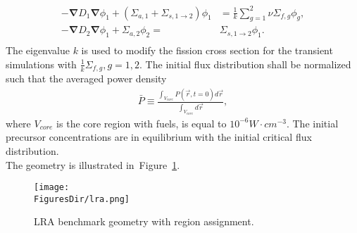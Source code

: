 \documentclass[12pt]{scrartcl}
\newcommand{\grad}{\bs{\nabla}}
\newcommand{\fig}[1]{Figure~\ref{#1}}                      %
\newcommand{\bs}[1]{\mathbf{#1}}
\newcommand{\FiguresDir}{./figs}
\begin{document}
\begin{align}
-\grad D_1 \grad\phi_1 + (\Sigma_{a,1} + \Sigma_{s, 1\rightarrow 2})\phi_1 &= \frac{1}{k}\sum_{g=1}^2 \nu\Sigma_{f,g}\phi_g, \\
-\grad D_2 \grad\phi_1 + \Sigma_{a,2}\phi_2 =& \Sigma_{s, 1\rightarrow 2}\phi_1. \\
\end{align}
The eigenvalue $k$ is used to modify the fission cross section for the transient simulations with $\frac{1}{k}\Sigma_{f,g}, g=1,2$.  The initial flux distribution shall be normalized such that the averaged power density
\begin{align}
\bar{P} \equiv \frac{\int_{V_{core}} P(\vec{r}, t=0) d\vec{r}}{\int_{V_{core}} d\vec{r}},
\end{align}
where $V_{core}$ is the core region with fuels, is equal to $10^{-6} W\cdot cm^{-3}$.
The initial precursor concentrations are in equilibrium with the initial critical flux distribution.\\

The geometry is illustrated in~\fig{fig:lra-geometry}.\\
\begin{figure}[H]
\centering
\texttt{[image: \\FiguresDir/lra.png]}
\caption{LRA benchmark geometry with region assignment.}
\label{fig:lra-geometry}
\end{figure}
\end{document}
